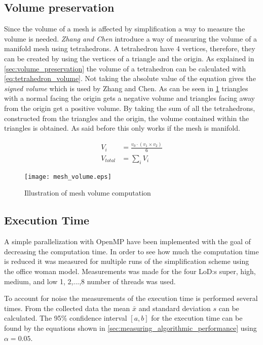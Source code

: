 \subsection{Volume preservation} \label{sec:computing_volume}
Since the volume of a mesh is affected by simplification a way to measure the volume is needed. \emph{Zhang and Chen} \cite{zhang2001efficient} introduce a way of measuring the volume of a manifold mesh using tetrahedrons. A tetrahedron have 4 vertices, therefore, they can be created by using the vertices of a triangle and the origin. As explained in \cref{sec:volume_preservation} the volume of a tetrahedron can be calculated with \cref{eq:tetrahedron_volume}. Not taking the absolute value of the equation gives the \emph{signed volume} which is used by Zhang and Chen. As can be seen in \cref{fig:mesh_volume} triangles with a normal facing the origin gets a negative volume and triangles facing away from the origin get a positive volume. By taking the sum of all the tetrahedrons, constructed from the triangles and the origin, the volume contained within the triangles is obtained. As said before this only works if the mesh is manifold.

\begin{align}
  V_i &= \frac{v_0 \cdot (v_1 \times v_2)}{6}\\
  V_{total} &= \sum_i{V_i}
\end{align}

\begin{figure}[h]
  \centering
  \texttt{[image: mesh\_volume.eps]}
  \caption{Illustration of mesh volume computation}
  \label{fig:mesh_volume}
  \end{figure}


\subsection{Execution Time} \label{sec:computation_time}
A simple parallelization with OpenMP have been implemented with the goal of decreasing the computation time. In order to see how much the computation time is reduced it was measured for multiple runs of the simplification scheme using the office woman model. Measurements was made for the four LoD:s super, high, medium, and low 1, 2,...,8 number of threads was used.

To account for noise the measurements of the execution time is performed several times. From the collected data the mean \(\bar{x}\) and standard deviation \(s\) can be calculated. The 95\% confidence interval \([a, b]\) for the execution time can be found by the equations shown in \cref{sec:measuring_algorithmic_performance} using \(\alpha = 0.05\).



